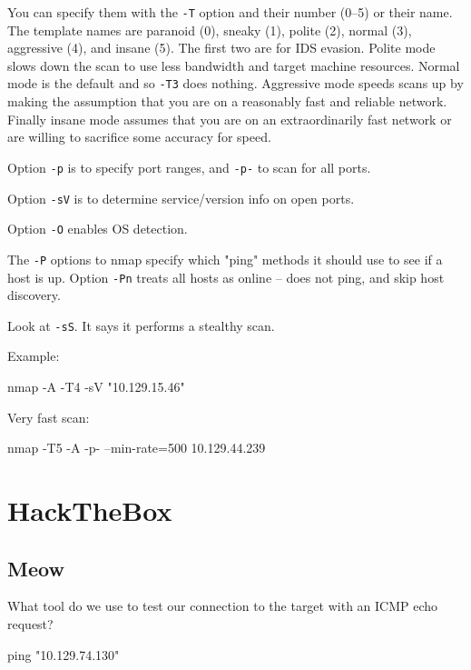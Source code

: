 \documentclass[a4paper,10pt]{article}
\begin{document}
\n

You can specify them with the \texttt{-T} option and their number (0–5) or their name. The template names are paranoid (0),
sneaky (1), polite (2), normal (3), aggressive (4), and insane (5). The first two are for IDS evasion. Polite mode slows down the scan to use less bandwidth and target machine resources. Normal mode is the default and
so \texttt{-T3} does nothing. Aggressive mode speeds scans up by making the assumption that you are on a reasonably fast and reliable network. Finally insane mode assumes that you are on an extraordinarily fast network or are
willing to sacrifice some accuracy for speed.

\n

Option \texttt{-p} is to specify port ranges, and \texttt{-p-} to scan for all ports.

\n

Option \texttt{-sV} is to determine service/version info on open ports.

\n

Option \texttt{-O} enables OS detection.

\n

The \texttt{-P} options to nmap specify which "ping" methods it should use to see if a host is up. Option \texttt{-Pn} treats all hosts as online -- does not ping, and skip host discovery.

\n

Look at \texttt{-sS}. It says it performs a stealthy scan.

Example:
\begin{bash}
nmap -A -T4 -sV "10.129.15.46"
\end{bash}

Very fast scan:
\begin{bash}
nmap -T5 -A -p- --min-rate=500 10.129.44.239
\end{bash}

\pagebreak

\section{HackTheBox}

\subsection{Meow \faLinux}

What tool do we use to test our connection to the target with an ICMP echo request?
\begin{bash}
ping "10.129.74.130"
\end{bash}
\end{document}
